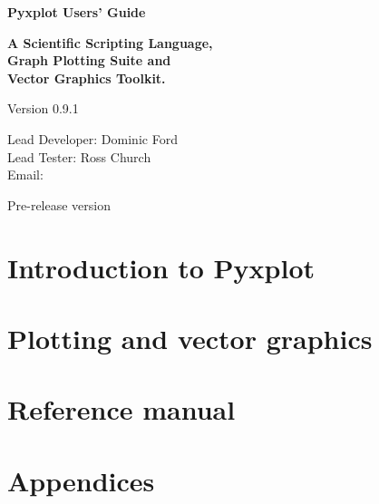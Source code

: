 \documentclass[a4paper,onecolumn,11pt]{book}
\def\version{0.9.1}
\def\reldate{Pre-release version}
\begin{document}
\begin{titlepage}
\normalsize
\begin{center}
{\Huge \bf Pyxplot Users' Guide}\\
\end{center}
\newline
\begin{center}
{\LARGE \bf A Scientific Scripting Language, \\ Graph Plotting Suite and \\ Vector Graphics Toolkit. \\}
\end{center}
\newline
\begin{center}
{\Large Version \version \\}
\end{center}
\newline
\begin{center}
{\large
Lead Developer: Dominic Ford \\
\vspace{1mm}
Lead Tester: Ross Church \\
\vspace{2mm}
Email:  \\
}
\end{center}
\newline
\begin{center}
{\Large \reldate \\}
\end{center}
\end{titlepage}

\part{Introduction to Pyxplot}







\part{Plotting and vector graphics}
\setcounter{chapter}{7}



\part{Reference manual}
\setcounter{chapter}{10}









\part{Appendices}
\appendix





\printindex
\end{document}
